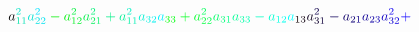 \documentclass[12pt]{article}
\begin{document}
\begin{displaymath}
{a} _ { \mathcolor[RGB]{0,225,165}{1} \mathcolor[RGB]{0,225,180}{1} } ^ { \mathcolor[RGB]{0,225,195}{2} } \mathcolor[RGB]{0,225,210}{a} _ { \mathcolor[RGB]{0,225,225}{2} \mathcolor[RGB]{0,225,240}{2} } ^ { \mathcolor[RGB]{0,225,255}{2} } \mathcolor[RGB]{0,240,0}{-} \mathcolor[RGB]{0,240,15}{a} _ { \mathcolor[RGB]{0,240,30}{1} \mathcolor[RGB]{0,240,45}{2} } ^ { \mathcolor[RGB]{0,240,60}{2} } \mathcolor[RGB]{0,240,75}{a} _ { \mathcolor[RGB]{0,240,90}{2} \mathcolor[RGB]{0,240,105}{1} } ^ { \mathcolor[RGB]{0,240,120}{2} } \mathcolor[RGB]{0,240,135}{+} \mathcolor[RGB]{0,240,150}{a} _ { \mathcolor[RGB]{0,240,165}{1} \mathcolor[RGB]{0,240,180}{1} } ^ { \mathcolor[RGB]{0,240,195}{2} } \mathcolor[RGB]{0,240,210}{a} _ { \mathcolor[RGB]{0,240,225}{3} \mathcolor[RGB]{0,240,240}{2} } \mathcolor[RGB]{0,240,255}{a} _ { \mathcolor[RGB]{0,255,0}{3} \mathcolor[RGB]{0,255,15}{3} } \mathcolor[RGB]{0,255,30}{+} \mathcolor[RGB]{0,255,45}{a} _ { \mathcolor[RGB]{0,255,60}{2} \mathcolor[RGB]{0,255,75}{2} } ^ { \mathcolor[RGB]{0,255,90}{2} } \mathcolor[RGB]{0,255,105}{a} _ { \mathcolor[RGB]{0,255,120}{3} \mathcolor[RGB]{0,255,135}{1} } \mathcolor[RGB]{0,255,150}{a} _ { \mathcolor[RGB]{0,255,165}{3} \mathcolor[RGB]{0,255,180}{3} } \mathcolor[RGB]{0,255,195}{-} \mathcolor[RGB]{0,255,210}{a} _ { \mathcolor[RGB]{0,255,225}{1} \mathcolor[RGB]{0,255,240}{2} } \mathcolor[RGB]{0,255,255}{a} _ { \mathcolor[RGB]{15,0,0}{1} \mathcolor[RGB]{15,0,15}{3} } \mathcolor[RGB]{15,0,30}{a} _ { \mathcolor[RGB]{15,0,45}{3} \mathcolor[RGB]{15,0,60}{1} } ^ { \mathcolor[RGB]{15,0,75}{2} } \mathcolor[RGB]{15,0,90}{-} \mathcolor[RGB]{15,0,105}{a} _ { \mathcolor[RGB]{15,0,120}{2} \mathcolor[RGB]{15,0,135}{1} } \mathcolor[RGB]{15,0,150}{a} _ { \mathcolor[RGB]{15,0,165}{2} \mathcolor[RGB]{15,0,180}{3} } \mathcolor[RGB]{15,0,195}{a} _ { \mathcolor[RGB]{15,0,210}{3} \mathcolor[RGB]{15,0,225}{2} } ^ { \mathcolor[RGB]{15,0,240}{2} } \mathcolor[RGB]{15,0,255}{+} \mathcolor[RGB]{15,15,0}{\,
}
\end{displaymath}
\end{document}
